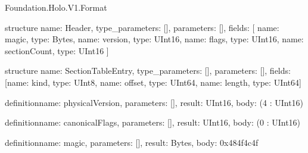 \begin{lexlean}{Foundation.Holo.V1.Format}
\begin{semanticmodule}
structure{
  name: Header,
  type_parameters: [],
  parameters: [],
  fields: [
    {name: magic, type: Bytes},
    {name: version, type: UInt16},
    {name: flags, type: UInt16},
    {name: sectionCount, type: UInt16}
  ]
}

structure{
  name: SectionTableEntry,
  type_parameters: [],
  parameters: [],
  fields: [{name: kind, type: UInt8}, {name: offset, type: UInt64}, {name: length, type: UInt64}]
}

definition{name: physicalVersion, parameters: [], result: UInt16, body: (4 : UInt16)}

definition{name: canonicalFlags, parameters: [], result: UInt16, body: (0 : UInt16)}

definition{name: magic, parameters: [], result: Bytes, body: 0x484f4c4f}
\end{semanticmodule}
\end{lexlean}
